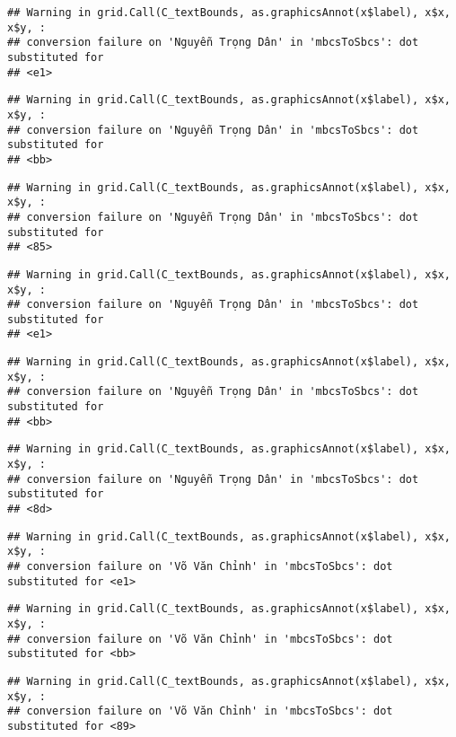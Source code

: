 \documentclass[
]{article}
\begin{document}
\begin{verbatim}
## Warning in grid.Call(C_textBounds, as.graphicsAnnot(x$label), x$x, x$y, :
## conversion failure on 'Nguyễn Trọng Dân' in 'mbcsToSbcs': dot substituted for
## <e1>
\end{verbatim}

\begin{verbatim}
## Warning in grid.Call(C_textBounds, as.graphicsAnnot(x$label), x$x, x$y, :
## conversion failure on 'Nguyễn Trọng Dân' in 'mbcsToSbcs': dot substituted for
## <bb>
\end{verbatim}

\begin{verbatim}
## Warning in grid.Call(C_textBounds, as.graphicsAnnot(x$label), x$x, x$y, :
## conversion failure on 'Nguyễn Trọng Dân' in 'mbcsToSbcs': dot substituted for
## <85>
\end{verbatim}

\begin{verbatim}
## Warning in grid.Call(C_textBounds, as.graphicsAnnot(x$label), x$x, x$y, :
## conversion failure on 'Nguyễn Trọng Dân' in 'mbcsToSbcs': dot substituted for
## <e1>
\end{verbatim}

\begin{verbatim}
## Warning in grid.Call(C_textBounds, as.graphicsAnnot(x$label), x$x, x$y, :
## conversion failure on 'Nguyễn Trọng Dân' in 'mbcsToSbcs': dot substituted for
## <bb>
\end{verbatim}

\begin{verbatim}
## Warning in grid.Call(C_textBounds, as.graphicsAnnot(x$label), x$x, x$y, :
## conversion failure on 'Nguyễn Trọng Dân' in 'mbcsToSbcs': dot substituted for
## <8d>
\end{verbatim}

\begin{verbatim}
## Warning in grid.Call(C_textBounds, as.graphicsAnnot(x$label), x$x, x$y, :
## conversion failure on 'Võ Văn Chỉnh' in 'mbcsToSbcs': dot substituted for <e1>
\end{verbatim}

\begin{verbatim}
## Warning in grid.Call(C_textBounds, as.graphicsAnnot(x$label), x$x, x$y, :
## conversion failure on 'Võ Văn Chỉnh' in 'mbcsToSbcs': dot substituted for <bb>
\end{verbatim}

\begin{verbatim}
## Warning in grid.Call(C_textBounds, as.graphicsAnnot(x$label), x$x, x$y, :
## conversion failure on 'Võ Văn Chỉnh' in 'mbcsToSbcs': dot substituted for <89>
\end{verbatim}
\end{document}
